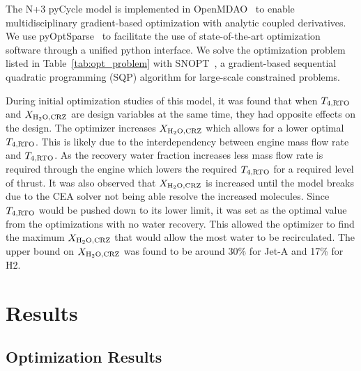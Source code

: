 \documentclass[conf]{new-aiaa}
\begin{document}
The N+3 pyCycle model is implemented in OpenMDAO~\cite{Gray2019a} to enable multidisciplinary gradient-based optimization with analytic coupled derivatives.
We use pyOptSparse~\cite{Wu2020a} to facilitate the use of state-of-the-art optimization software through a unified python interface.
We solve the optimization problem listed in Table~\ref{tab:opt_problem} with SNOPT~\cite{Gill2005a}, a gradient-based sequential quadratic programming (SQP) algorithm for large-scale constrained problems.

During initial optimization studies of this model, it was found that when $T_{4,\rm{RTO}}$ and $X_{\rm{H_2O,CRZ}}$ are design variables at the same time, they had opposite effects on the design.
The optimizer increases $X_{\rm{H_2O,CRZ}}$ which allows for a lower optimal $T_{4,\rm{RTO}}$.
This is likely due to the interdependency between engine mass flow rate and $T_{4,\rm{RTO}}$.
As the recovery water fraction increases less mass flow rate is required through the engine which lowers the required $T_{4,\rm{RTO}}$ for a required level of thrust.
It was also observed that $X_{\rm{H_2O,CRZ}}$ is increased until the model breaks due to the CEA solver not being able resolve the increased  molecules.
Since $T_{4,\rm{RTO}}$ would be pushed down to its lower limit, it was set as the optimal value from the optimizations with no water recovery.
This allowed the optimizer to find the maximum $X_{\rm{H_2O,CRZ}}$ that would allow the most water to be recirculated.
The upper bound on $X_{\rm{H_2O,CRZ}}$ was found to be around 30\% for Jet-A and 17\% for H2.

\section{Results}
\label{sec:results}

\subsection{Optimization Results}
\label{sub:opt_res}
\end{document}
